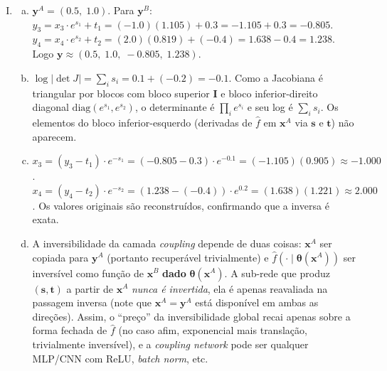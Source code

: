 \documentclass{dlproblemset}
\begin{document}
\begin{enumerate}[I)]
    \item
    \begin{enumerate}[(a)]
        \item $\mathbf{y}^A = (0.5,\; 1.0)$. Para $\mathbf{y}^B$: $y_3 = x_3 \cdot e^{s_1} + t_1 = (-1.0)(1.105) + 0.3 = -1.105 + 0.3 = -0.805$. $y_4 = x_4 \cdot e^{s_2} + t_2 = (2.0)(0.819) + (-0.4) = 1.638 - 0.4 = 1.238$. Logo $\mathbf{y} \approx (0.5,\; 1.0,\; -0.805,\; 1.238)$.
        \item $\log|\det J| = \sum_i s_i = 0.1 + (-0.2) = -0.1$. Como a Jacobiana é triangular por blocos com bloco superior $\mathbf{I}$ e bloco inferior-direito diagonal $\mathrm{diag}(e^{s_1}, e^{s_2})$, o determinante é $\prod_i e^{s_i}$ e seu log é $\sum_i s_i$. Os elementos do bloco inferior-esquerdo (derivadas de $\hat{f}$ em $\mathbf{x}^A$ via $\mathbf{s}$ e $\mathbf{t}$) não aparecem.
        \item $x_3 = (y_3 - t_1) \cdot e^{-s_1} = (-0.805 - 0.3) \cdot e^{-0.1} = (-1.105)(0.905) \approx -1.000$. $x_4 = (y_4 - t_2) \cdot e^{-s_2} = (1.238 - (-0.4)) \cdot e^{0.2} = (1.638)(1.221) \approx 2.000$. Os valores originais são reconstruídos, confirmando que a inversa é exata.
        \item A inversibilidade da camada \textit{coupling} depende de duas coisas: $\mathbf{x}^A$ ser copiada para $\mathbf{y}^A$ (portanto recuperável trivialmente) e $\hat{f}(\cdot \mid \boldsymbol{\theta}(\mathbf{x}^A))$ ser inversível como função de $\mathbf{x}^B$ \textbf{dado} $\boldsymbol{\theta}(\mathbf{x}^A)$. A sub-rede que produz $(\mathbf{s}, \mathbf{t})$ a partir de $\mathbf{x}^A$ \emph{nunca é invertida}, ela é apenas reavaliada na passagem inversa (note que $\mathbf{x}^A = \mathbf{y}^A$ está disponível em ambas as direções). Assim, o ``preço'' da inversibilidade global recai apenas sobre a forma fechada de $\hat{f}$ (no caso afim, exponencial mais translação, trivialmente inversível), e a \textit{coupling network} pode ser qualquer MLP/CNN com ReLU, \textit{batch norm}, etc.
    \end{enumerate}


\end{enumerate}
\end{document}
